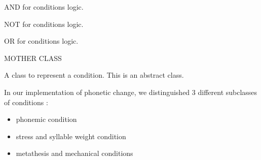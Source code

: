 \documentclass[letterpaper,10pt,english]{sphinxmanual}
\begin{document}
\begin{fulllineitems}
\label{\detokenize{index:Condition.Cond_AND}}
\sphinxAtStartPar
AND for conditions logic.

\end{fulllineitems}


\begin{fulllineitems}
\label{\detokenize{index:Condition.Cond_NOT}}
\sphinxAtStartPar
NOT for conditions logic.

\end{fulllineitems}


\begin{fulllineitems}
\label{\detokenize{index:Condition.Cond_OR}}
\sphinxAtStartPar
OR for conditions logic.

\end{fulllineitems}


\begin{fulllineitems}
\label{\detokenize{index:Condition.Condition}}
\sphinxAtStartPar
MOTHER CLASS

\sphinxAtStartPar
A class to represent a condition.
This is an abstract class.

\sphinxAtStartPar
In our implementation of phonetic change, we distinguished 3 different subclasses of conditions :
\begin{itemize}
\item {} 
\sphinxAtStartPar
phonemic condition

\item {} 
\sphinxAtStartPar
stress and syllable weight condition

\item {} 
\sphinxAtStartPar
metathesis and mechanical conditions

\end{itemize}

\end{fulllineitems}
\end{document}
